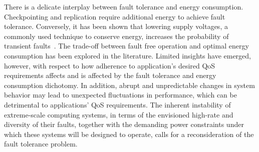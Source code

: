 There is a delicate interplay between fault tolerance and energy consumption. Checkpointing and replication require additional energy to achieve fault tolerance. Conversely, it has been shown that lowering supply voltages, a commonly used technique to conserve energy, increases the probability of transient faults~\cite{chandra2008defect}. The trade-off between fault free operation and optimal energy consumption has been explored in the literature. Limited insights have emerged, however, with respect to how adherence to application's desired QoS requirements affects and is affected by the fault tolerance and energy consumption dichotomy. %
In addition, abrupt and unpredictable changes in system behavior may lead to unexpected fluctuations in performance, which can be detrimental to applications' QoS requirements. The inherent instability of extreme-scale computing systems, in terms of the envisioned high-rate and diversity of their faults, together with the demanding power constraints under which these systems will be designed to operate, calls for a reconsideration of the fault tolerance problem.

